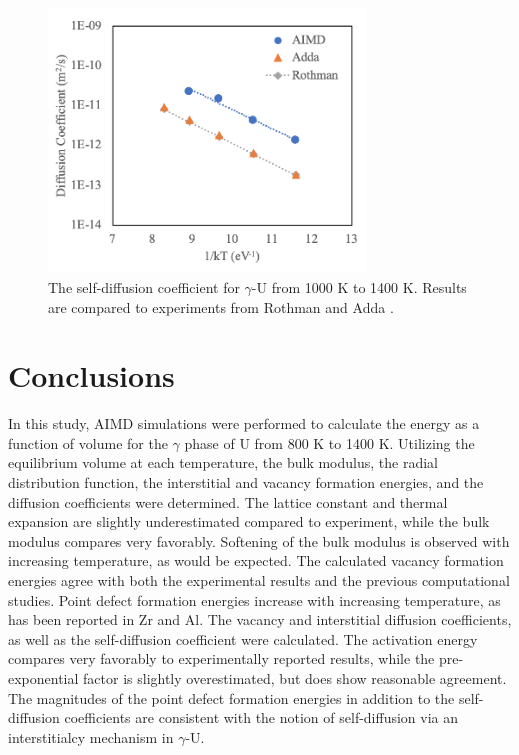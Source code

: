 \documentclass[review]{elsarticle}
\begin{document}
 \begin{figure}[h]
 \centering
 \includegraphics[width=0.75\textwidth]{self_diff.png} 
 \caption{The self-diffusion coefficient for $\gamma$-U from 1000 K to 1400 K. Results are compared to experiments from Rothman \cite{rothman1959} and Adda \cite{adda1959}. }
 \label{fig:selfdiff}
\end{figure}

\FloatBarrier

\section{Conclusions}

In this study, AIMD simulations were performed to calculate the energy as a function of volume for the $\gamma$ phase of U from 800 K to 1400 K. Utilizing the equilibrium volume at each temperature, the bulk modulus, the radial distribution function, the interstitial and vacancy formation energies, and the diffusion coefficients were determined. The lattice constant and thermal expansion are slightly underestimated compared to experiment, while the bulk modulus compares very favorably. Softening of the bulk modulus is observed with increasing temperature, as would be expected. The calculated vacancy formation energies agree with both the experimental results and the previous computational studies. Point defect formation energies increase with increasing temperature, as has been reported in Zr and Al. The vacancy and interstitial diffusion coefficients, as well as the self-diffusion coefficient were calculated. The activation energy compares very favorably to experimentally reported results, while the pre-exponential factor is slightly overestimated, but does show reasonable agreement. The magnitudes of the point defect formation energies in addition to the self-diffusion coefficients are consistent with the notion of self-diffusion via an interstitialcy mechanism in $\gamma$-U. 
\end{document}
